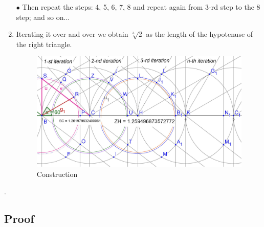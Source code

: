 \documentclass[12pt, letterpaper, oneside]{report}
\begin{document}
\begin{enumerate}
$\bullet$ Then repeat the steps: 4, 5, 6, 7, 8 and repeat again from 3-rd step to the 8 step; and so on...\\
	\item Iterating it over and over we obtain $\sqrt[3]{2}$ as the length of the hypotenuse of the right triangle.
\begin{figure}[h]
	\centering
	\includegraphics[width=0.7\linewidth]{images/iterations.jpg}
	\caption{Construction}
	\label{construction}
\end{figure}
\end{enumerate}.

\newpage

\subsection{Proof} 
\end{document}
